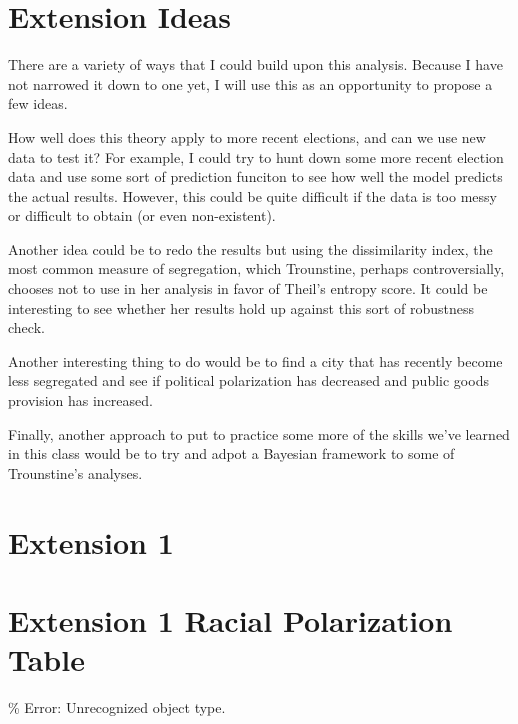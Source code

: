 \documentclass[]{article}
\begin{document}
\hypertarget{extension-ideas}{%
\section{Extension Ideas}\label{extension-ideas}}

There are a variety of ways that I could build upon this analysis.
Because I have not narrowed it down to one yet, I will use this as an
opportunity to propose a few ideas.

How well does this theory apply to more recent elections, and can we use
new data to test it? For example, I could try to hunt down some more
recent election data and use some sort of prediction funciton to see how
well the model predicts the actual results. However, this could be quite
difficult if the data is too messy or difficult to obtain (or even
non-existent).

Another idea could be to redo the results but using the dissimilarity
index, the most common measure of segregation, which Trounstine, perhaps
controversially, chooses not to use in her analysis in favor of Theil's
entropy score. It could be interesting to see whether her results hold
up against this sort of robustness check.

Another interesting thing to do would be to find a city that has
recently become less segregated and see if political polarization has
decreased and public goods provision has increased.

Finally, another approach to put to practice some more of the skills
we've learned in this class would be to try and adpot a Bayesian
framework to some of Trounstine's analyses.

\hypertarget{extension-1}{%
\section{Extension 1}\label{extension-1}}

\hypertarget{extension-1-racial-polarization-table}{%
\section{Extension 1 Racial Polarization
Table}\label{extension-1-racial-polarization-table}}

\% Error: Unrecognized object type.
\captionsetup[table]{labelformat=empty,skip=1pt}
\end{document}
